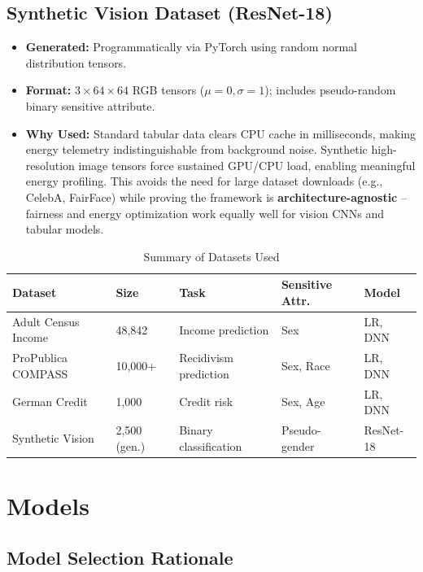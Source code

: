 \documentclass[12pt,a4paper]{article}
\begin{document}
\subsection{Synthetic Vision Dataset (ResNet-18)}

\begin{itemize}
    \item \textbf{Generated:} Programmatically via PyTorch using random normal distribution tensors.
    \item \textbf{Format:} $3 \times 64 \times 64$ RGB tensors ($\mu=0, \sigma=1$); includes pseudo-random binary sensitive attribute.
    \item \textbf{Why Used:} Standard tabular data clears CPU cache in milliseconds, making energy telemetry indistinguishable from background noise. Synthetic high-resolution image tensors force sustained GPU/CPU load, enabling meaningful energy profiling. This avoids the need for large dataset downloads (e.g., CelebA, FairFace) while proving the framework is \textbf{architecture-agnostic} -- fairness and energy optimization work equally well for vision CNNs and tabular models.
\end{itemize}

\begin{table}[h]
\centering
\caption{Summary of Datasets Used}
\begin{tabular}{lllll}
\toprule
\textbf{Dataset} & \textbf{Size} & \textbf{Task} & \textbf{Sensitive Attr.} & \textbf{Model} \\
\midrule
Adult Census Income & 48,842 & Income prediction & Sex & LR, DNN \\
ProPublica COMPASS & 10,000+ & Recidivism prediction & Sex, Race & LR, DNN \\
German Credit & 1,000 & Credit risk & Sex, Age & LR, DNN \\
Synthetic Vision & 2,500 (gen.) & Binary classification & Pseudo-gender & ResNet-18 \\
\bottomrule
\end{tabular}
\end{table}

\section{Models}

\subsection{Model Selection Rationale}
\end{document}
